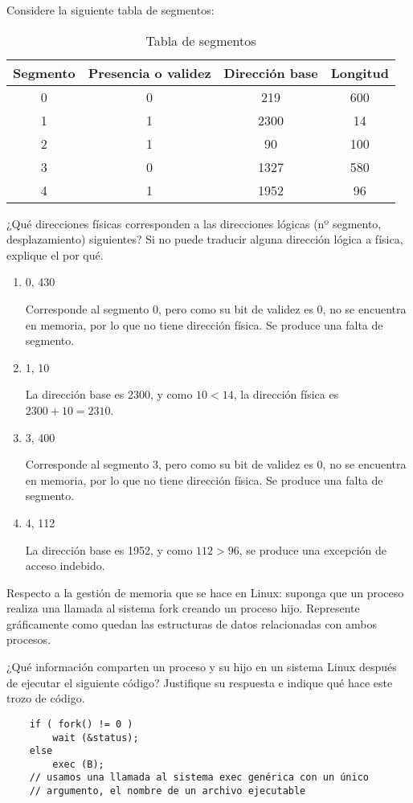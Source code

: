 \begin{ejercicio}
    Considere la siguiente tabla de segmentos:
    \begin{table}[H]
        \centering
        \begin{tabular}{|c|c|c|c|}
            \hline
            Segmento & Presencia o validez & Dirección base & Longitud \\
            \hline
            0 & 0 & 219 & 600 \\
            1 & 1 & 2300 & 14 \\
            2 & 1 & 90 & 100 \\
            3 & 0 & 1327 & 580 \\
            4 & 1 & 1952 & 96 \\
            \hline
        \end{tabular}
        \caption{Tabla de segmentos}
    \end{table}
    ¿Qué direcciones físicas corresponden a las direcciones lógicas (nº segmento,
desplazamiento) siguientes? Si no puede traducir alguna dirección lógica a física, explique el
por qué.
\begin{enumerate}
    \item 0, 430
    
    Corresponde al segmento 0, pero como su bit de validez es 0, no se encuentra en memoria, por lo que no tiene dirección física.  Se produce una falta de segmento.
    \item 1, 10
    
    La dirección base es 2300, y como $10 < 14$, la dirección física es $2300 + 10 = 2310$.
    \item 3, 400
    
    Corresponde al segmento 3, pero como su bit de validez es 0, no se encuentra en memoria, por lo que no tiene dirección física. Se produce una falta de segmento.
    \item 4, 112
    
    La dirección base es 1952, y como $112 > 96$, se produce una excepción de acceso indebido.
\end{enumerate}
\end{ejercicio}


\begin{ejercicio}
    Respecto a la gestión de memoria que se hace en Linux: suponga que un proceso realiza
una llamada al sistema fork creando un proceso hijo. Represente gráficamente como
quedan las estructuras de datos relacionadas con ambos procesos.
\end{ejercicio}


\begin{ejercicio}
    ¿Qué información comparten un proceso y su hijo en un sistema Linux después de
ejecutar el siguiente código? Justifique su respuesta e indique qué hace este trozo de
código.
\begin{verbatim}
    if ( fork() != 0 )
        wait (&status);
    else
        exec (B);
    // usamos una llamada al sistema exec genérica con un único
    // argumento, el nombre de un archivo ejecutable
\end{verbatim}
\end{ejercicio}